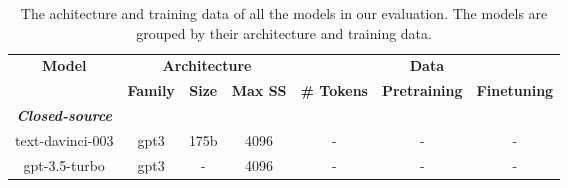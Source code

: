 
\begin{table}[]
\centering
\caption{The achitecture and training data of all the models in our evaluation. The models are grouped by their architecture and training data.}
\label{tab:all_models}
\begin{adjustbox}{max width=\textwidth}

\setlength{\tabcolsep}{2pt}
\begin{tabular}{ccccccc}
\toprule
\multicolumn{1}{c}{\multirow{2}{*}{\textbf{Model}}} & \multicolumn{3}{c}{\textbf{Architecture}}                                                                             & \multicolumn{3}{c}{\textbf{Data}}                                                                                                                                                                                       \\
\cmidrule(lr){2-4} \cmidrule(lr){5-7}
\multicolumn{1}{c}{}                                & \multicolumn{1}{c}{\textbf{Family}} & \multicolumn{1}{c}{\textbf{Size}} & \multicolumn{1}{c}{\textbf{Max SS}} & \multicolumn{1}{c}{\textbf{\# Tokens}} & \multicolumn{1}{c}{\textbf{Pretraining}}                                                                                  & \multicolumn{1}{c}{\textbf{Finetuning}} \\
\midrule
\multicolumn{1}{c}{\textit{\textbf{Closed-source}}}          &                                     &                                   &                                     &                                        &                                                                                                                           &                                                    \\
text-davinci-003                                    & gpt3                                & 175b                              & 4096                                & -                                      & -                                                                                                                         & -                                                  \\
gpt-3.5-turbo                                       & gpt3                                & -                                 & 4096                                & -                                      & -                                                                                                                         & -                                                  \\

\end{tabular}
\end{adjustbox}
\end{table}
